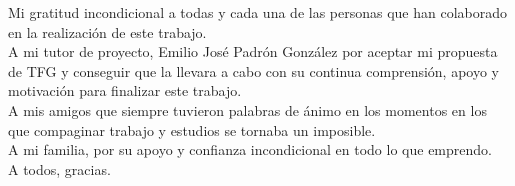 \documentclass[11pt,a4paper,titlepage,oneside]{report}
\begin{document}

 
 
 \paxinaenbranco
 \begin{agradecementos}
 Mi gratitud incondicional a todas y cada una de las personas que han colaborado en la realización de este trabajo.\\ 
 A mi tutor de proyecto, Emilio José Padrón González por aceptar mi propuesta de TFG y conseguir que la llevara a cabo con su continua comprensión, apoyo y motivación para finalizar este trabajo.\\
 A mis amigos que siempre tuvieron palabras de ánimo en los momentos en los que compaginar trabajo y estudios se tornaba un imposible. \\
 A mi familia, por su apoyo y confianza incondicional en todo lo que emprendo. \\
 A todos, gracias.
 \end{agradecementos}
 

 \setcounter{page}{1}

 \tableofcontents
 \listoffigures
 \listoftables
 \clearpage
 
 \setcounter{page}{1}


 
 
 
 
  
  
  
 
%
 


 \appendix
 \appendixpage
 
 
%

 \printglossary[type=\acronymtype,title=\nomeglosarioacronimos]
 \printglossary[title=\nomeglosariotermos]

 
 
 \nocite{*} %

 \clearpage
 
\end{document}
